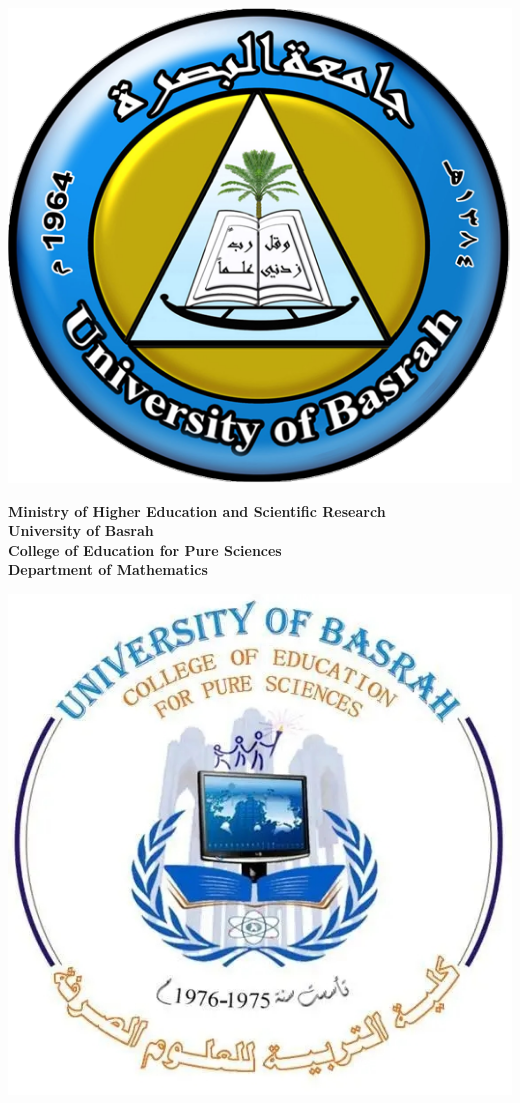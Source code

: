 \begin{titlepage}
\begin{minipage}{0.2\textwidth}
\raggedleft\includegraphics[scale=0.2]{Pictures/20231126094730!جامعة_البصرة.png}
\end{minipage}
\hfill
\begin{minipage}{0.5\textwidth}
    \centering
    \textbf{Ministry of Higher Education and Scientific Research}\\
    \textbf{ University of Basrah}\\
    \textbf{College of Education for Pure Sciences}\\
    \textbf{Department of Mathematics}
\end{minipage}
\hfill
\begin{minipage}{0.2\textwidth}
\raggedright\includegraphics[scale=0.2]{Pictures/FB_IMG_17029184953253241.jpg}  

\end{minipage}
\end{titlepage}
